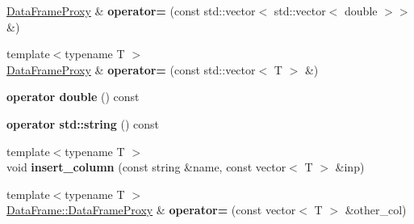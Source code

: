 \begin{DoxyCompactItemize}
\hyperlink{classDataFrame_1_1DataFrameProxy}{Data\+Frame\+Proxy} \& {\bfseries operator=} (const std\+::vector$<$ std\+::vector$<$ double $>$$>$ \&)
\item 
\mbox{\label{classDataFrame_1_1DataFrameProxy_a25774e44f4e4d36e5b640e7387d24361}} 
{\footnotesize template$<$typename T $>$ }\\\hyperlink{classDataFrame_1_1DataFrameProxy}{Data\+Frame\+Proxy} \& {\bfseries operator=} (const std\+::vector$<$ T $>$ \&)
\item 
\mbox{\label{classDataFrame_1_1DataFrameProxy_a942013d9c0ab98e5bf30042f43b7271e}} 
{\bfseries operator double} () const
\item 
\mbox{\label{classDataFrame_1_1DataFrameProxy_adaee50dab0cde6cb8e896440fca846dd}} 
{\bfseries operator std\+::string} () const
\item 
\mbox{\label{classDataFrame_1_1DataFrameProxy_a74080fd3f0407cefdb332062ca91ecc9}} 
{\footnotesize template$<$typename T $>$ }\\void {\bfseries insert\+\_\+column} (const string \&name, const vector$<$ T $>$ \&inp)
\item 
\mbox{\label{classDataFrame_1_1DataFrameProxy_a6910b480e16f67a6ae3f5d36757c0a57}} 
{\footnotesize template$<$typename T $>$ }\\\hyperlink{classDataFrame_1_1DataFrameProxy}{Data\+Frame\+::\+Data\+Frame\+Proxy} \& {\bfseries operator=} (const vector$<$ T $>$ \&other\+\_\+col)
\end{DoxyCompactItemize}
